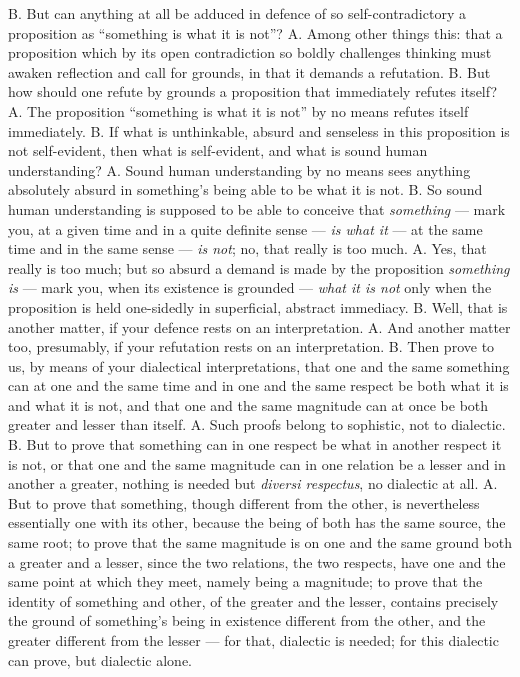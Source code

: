 \documentclass[12pt,a4paper]{book}
\begin{document}
B. But can anything at all be adduced in defence of so self-contradictory a
proposition as ``something is what it is not''? A. Among other things this:
that a proposition which by its open contradiction so boldly challenges
thinking must awaken reflection and call for grounds, in that it demands a
refutation. B. But how should one refute by grounds a proposition that
immediately refutes itself? A. The proposition ``something is what it is not''
by no means refutes itself immediately. B. If what is unthinkable, absurd and
senseless in this proposition is not self-evident, then what is self-evident,
and what is sound human understanding? A. Sound human understanding by no means
sees anything absolutely absurd in something's being able to be what it is not.
B. So sound human understanding is supposed to be able to conceive that
\emph{something} --- mark you, at a given time and in a quite definite sense
--- \emph{is what it} --- at the same time and in the same sense --- \emph{is
not}; no, that really is too much. A. Yes, that really is too much; but so
absurd a demand is made by the proposition \emph{something is} --- mark you,
when its existence is grounded --- \emph{what it is not} only when the
proposition is held one-sidedly in superficial, abstract immediacy. B. Well,
that is another matter, if your defence rests on an interpretation.
A. And another matter too, presumably, if your refutation rests on an
interpretation. B. Then prove to us, by means of your dialectical
interpretations, that one and the same something can at one and the same time
and in one and the same respect be both what it is and what it is not, and that
one and the same magnitude can at once be both greater and lesser than itself.
A. Such proofs belong to sophistic, not to dialectic. B. But to prove that
something can in one respect be what in another respect it is not, or that one
and the same magnitude can in one relation be a lesser and in another a
greater, nothing is needed but \textit{diversi respectus}, no dialectic at all.
A. But to prove that something, though different from the other, is
nevertheless essentially one with its other, because the being of both has the
same source, the same root; to prove that the same magnitude is on one and the
same ground both a greater and a lesser, since the two relations, the two
respects, have one and the same point at which they meet, namely being a
magnitude; to prove that the identity
of something and other, of the greater and the lesser, contains precisely the
ground of something's being in existence different from the other, and the
greater different from the lesser --- for that, dialectic is needed; for this
dialectic can prove, but dialectic alone.
\end{document}
